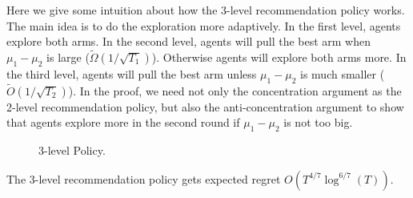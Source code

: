 Here we give some intuition about how the 3-level recommendation
policy works. The main idea is to do the exploration more
adaptively. In the first level, agents explore both arms. In the
second level, agents will pull the best arm when $\mu_1 - \mu_2$ is
large ($\tilde{\Omega}(1/\sqrt{T_1})$). Otherwise agents will explore
both arms more. In the third level, agents will pull the best arm
unless $\mu_1-\mu_2$ is much smaller ($\tilde{O}(1/\sqrt{T_2})$). In
the proof, we need not only the concentration argument as the 2-level
recommendation policy, but also the anti-concentration argument to
show that agents explore more in the second round if $\mu_1-\mu_2$ is
not too big.  \fi


\begin{figure}[H]
\centering
{}
\caption{3-level Policy.}
\label{fig:3level}
\end{figure}



\begin{theorem}
\label{thm:3level}
The 3-level recommendation policy gets expected regret $O(T^{4/7} \log^{6/7}(T))$. 
\end{theorem}

